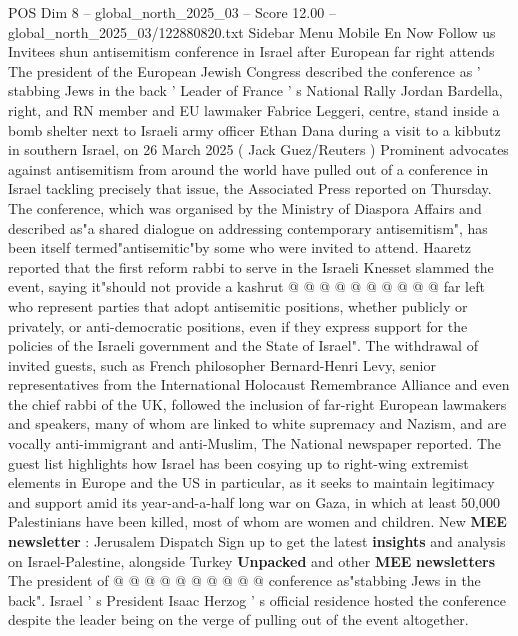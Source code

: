 \begin{textsample}{POS Dim 8 – global\_north\_2025\_03 – Score 12.00 – global\_north\_2025\_03/122880820.txt}  \label{ex:f8_pos_089}
Sidebar Menu Mobile En Now Follow us Invitees shun antisemitism conference in Israel after European far right attends The president of the European Jewish Congress described the conference as ' stabbing Jews in the back ' Leader of France ' s National Rally Jordan Bardella, right, and RN member and EU lawmaker Fabrice Leggeri, centre, stand inside a bomb shelter next to Israeli army officer Ethan Dana during a visit to a kibbutz in southern Israel, on 26 March 2025 ( Jack Guez/Reuters ) Prominent advocates against antisemitism from around the world have pulled out of a conference in Israel tackling precisely that issue, the Associated Press reported on Thursday.
The conference, which was organised by the Ministry of Diaspora Affairs and described as"a shared dialogue on addressing contemporary antisemitism", has been itself termed"antisemitic"by some who were invited to attend.
Haaretz reported that the first reform rabbi to serve in the Israeli Knesset slammed the event, saying it"should not provide a kashrut @ @ @ @ @ @ @ @ @ @ far left who represent parties that adopt antisemitic positions, whether publicly or privately, or anti-democratic positions, even if they express support for the policies of the Israeli government and the State of Israel".
The withdrawal of invited guests, such as French philosopher Bernard-Henri Levy, senior representatives from the International Holocaust Remembrance Alliance and even the chief rabbi of the UK, followed the inclusion of far-right European lawmakers and speakers, many of whom are linked to white supremacy and Nazism, and are vocally anti-immigrant and anti-Muslim, The National newspaper reported.
The guest list highlights how Israel has been cosying up to right-wing extremist elements in Europe and the US in particular, as it seeks to maintain legitimacy and support amid its year-and-a-half long war on Gaza, in which at least 50,000 Palestinians have been killed, most of whom are women and children.
New \textbf{MEE} \textbf{newsletter} : Jerusalem Dispatch Sign up to get the latest \textbf{insights} and analysis on Israel-Palestine, alongside Turkey \textbf{Unpacked} and other \textbf{MEE} \textbf{newsletters} The president of @ @ @ @ @ @ @ @ @ @ conference as"stabbing Jews in the back".
Israel ' s President Isaac Herzog ' s official residence hosted the conference despite the leader being on the verge of pulling out of the event altogether.

\end{textsample}
